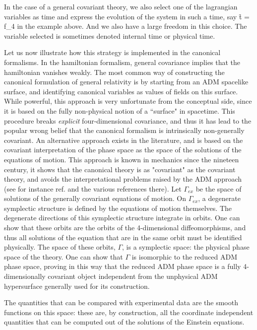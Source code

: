 In the case of a general covariant theory, we also select one of
the lagrangian variables as time and express the evolution of
the system in such a time, say
\f
	t = f_4
\ff
in the example above.  And we also have a large freedom in this
choice. The variable selected is sometimes denoted internal time
or physical time.

Let us now illustrate how this strategy is implemented in the
canonical formalisms. In the hamiltonian formalism, general
covariance implies that the hamiltonian vanishes weakly.  The
most common way of constructing the canonical formulation of
general relativity is by starting from an ADM spacelike surface,
and identifying canonical variables as values of fields on this
surface.  While   powerful, this approach is very
unfortunate from the conceptual side, since it is based on the
fully non-physical notion of a ``surface" in spacetime.  This
procedure breaks {\it explicit\/} four-dimensional covariance,
and thus it has lead to the popular wrong belief that the canonical
formalism is intrinsically non-generally covariant.  An
alternative approach exists in the literature, and is based on the
covariant interpretation of the phase space as the space of the
solutions of the equations of motion.   This approach is known in
mechanics since the nineteen century, it shows that the canonical
theory is as "covariant" as the covariant theory, and avoids the
interpretational problems raised by the ADM approach (see for
instance ref. \cite{luca} and the various references there). Let
$\Gamma_{ex}$ be the space of solutions of the generally
covariant equations of motion.  On $\Gamma_{ex}$,
a degenerate symplectic structure is defined by the equations
of motion themselves.    The degenerate directions of this
symplectic structure integrate in orbits. One can show that these
orbits are the orbits of the 4-dimensional diffeomorphisms,
and thus all solutions of the equation that are in the same orbit
must be identified physically.  The space of these
orbits, $\Gamma$, is a symplectic space: the physical phase
space of the theory.   One can show that $\Gamma$ is isomorphic
to the reduced ADM phase space, proving in this way that the
reduced ADM phase space is a fully 4-dimensionally covariant
object independent from the unphysical ADM hypersurface
generally used for its construction.

The quantities that can be compared with
experimental data are the smooth functions on this space: these
are, by construction, all the coordinate independent quantities
that can be computed out of the solutions of the Einstein
equations.


